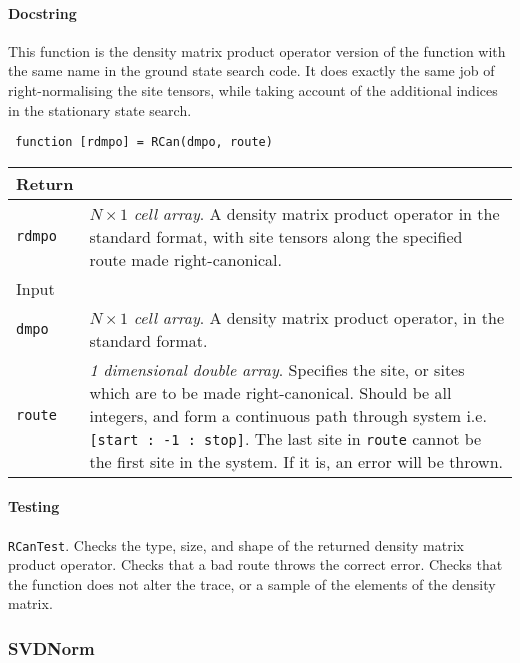  \paragraph{Docstring} This function is the density matrix product operator version of the function with the same name in the ground state search code. It does exactly the same job of right-normalising the site tensors, while taking account of the additional indices in the stationary state search.
 \begin{lstlisting}
 function [rdmpo] = RCan(dmpo, route) \end{lstlisting}
  \begin{longtabu}{X[1,l]X[4,l]}
 \hline
 Return & \\ \hline
 \lstinline$rdmpo$ & \emph{\(N \times 1\) cell array}. A density matrix product operator in the standard format, with site tensors along the specified route made right-canonical. \\ \hline
 Input & \\
 \lstinline$dmpo$ & \emph{\(N \times 1\) cell array}. A density matrix product operator, in the standard format. \\
 \lstinline$route$ & \emph{1 dimensional double array}. Specifies the site, or sites which are to be made right-canonical. Should be all integers, and form a continuous path through system i.e. \lstinline$[start : -1 : stop]$. The last site in \lstinline$route$ cannot be the first site in the system. If it is, an error will be thrown. \\
 \hline
 \end{longtabu}
 \paragraph{Testing} \lstinline$RCanTest$.  Checks the type, size, and shape of the returned density matrix product operator. Checks that a bad route throws the correct error. Checks that the function does not alter the trace, or a sample of the elements of the density matrix. 
 
 \subsubsection{SVDNorm}
